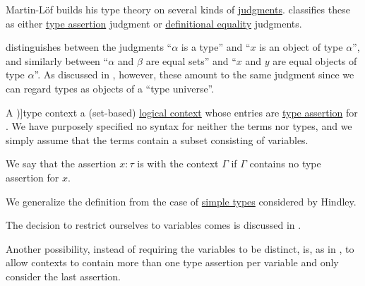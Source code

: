 \begin{remark}\label{rem:type_judgments}
  Martin-L\"of builds his type theory on several kinds of \hyperref[con:judgment]{judgments}. \cite[19]{UnivalentProject2024OctoberHoTT} classifies these as either \hyperref[def:type_assertion]{type assertion} judgment or \hyperref[con:definitional_equality]{definitional equality} judgments.

   distinguishes between the judgments \enquote{\( \alpha \) is a type} and \enquote{\( x \) is an object of type \( \alpha \)}, and similarly between \enquote{\( \alpha \) and \( \beta \) are equal sets} and \enquote{\( x \) and \( y \) are equal objects of type \( \alpha \)}. As discussed in , however, these amount to the same judgment since we can regard types as objects of a \enquote{type universe}.
\end{remark}

\begin{definition}\label{def:type_context}
  A \term[en=type-context (\cite[def. 2A5]{Hindley1997STT})]{type context} a (set-based) \hyperref[def:logical_context]{logical context} whose entries are \hyperref[def:type_assertion]{type assertion} for . We have purposely specified no syntax for neither the terms nor types, and we simply assume that the terms contain a subset consisting of variables.

  We say that the assertion \( x: \tau \) is  with the context \( \Gamma \) if \( \Gamma \) contains no type assertion for \( x \).
\end{definition}
\begin{comments}
  \item We generalize the definition from the case of \hyperref[def:simple_type]{simple types} considered by Hindley.

  \item The decision to restrict ourselves to variables comes is discussed in .

  \item Another possibility, instead of requiring the variables to be distinct, is, as in \cite[159]{Mimram2020Types}, to allow contexts to contain more than one type assertion per variable and only consider the last assertion.
\end{comments}

